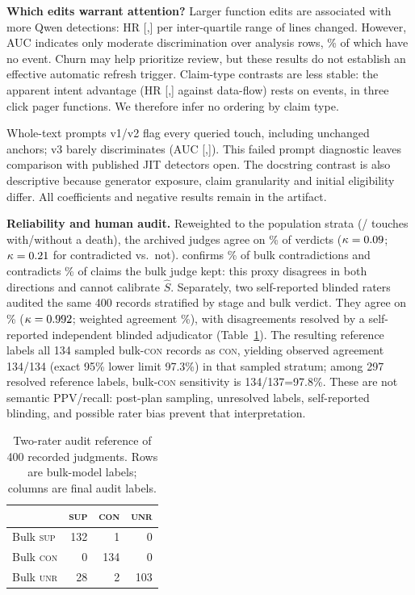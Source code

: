 \textbf{Which edits warrant attention?} Larger function edits are associated with more Qwen detections: HR \XLogLinesFnIqrHr{} [\XLogLinesFnIqrHrLo,\XLogLinesFnIqrHrHi] per inter-quartile range of lines changed. However, AUC \XHOneAucFn{} indicates only moderate discrimination over \XHOneNPairs{} analysis rows, \XHOneZeroShare\% of which have no event. Churn may help prioritize review, but these results do not establish an effective automatic refresh trigger. Claim-type contrasts are less stable: the apparent intent advantage (HR \XCloglogTyIntent{} [\XCloglogTyIntentLo,\XCloglogTyIntentHi] against data-flow) rests on \XHTwoIntentDeaths{} events, \XHTwoIntentDeathsClick{} in three click pager functions. We therefore infer no ordering by claim type.

Whole-text prompts v1/v2 flag every queried touch, including unchanged anchors; v3 barely discriminates (AUC \XHThreeVThreeAuc{} [\XHThreeVThreeAucLo,\XHThreeVThreeAucHi]). This failed prompt diagnostic leaves comparison with published JIT detectors open. The docstring contrast is also descriptive because generator exposure, claim granularity and initial eligibility differ. All coefficients and negative results remain in the artifact.

\textbf{Reliability and human audit.} Reweighted to the population strata (\XAFramePos{}/\XAFrameNeg{} touches with/without a death), the archived judges agree on \XAJudgeCommitAgreePct\% of verdicts ($\kappa=0.09$; $\kappa=0.21$ for contradicted vs.\ not). \XSecondModel{} confirms \XAJudgeCommitPrecision\% of bulk contradictions and contradicts \XAJudgeCommitSecondConWhereBulkNot\% of claims the bulk judge kept: this proxy disagrees in both directions and cannot calibrate $\hat S$. Separately, two self-reported blinded raters audited the same 400 records stratified by stage and bulk verdict. They agree on \XTwoRaterAgree\% ($\kappa=0.992$; weighted agreement \XTwoRaterWeightedAgree\%), with \XTwoRaterDisagreements{} disagreements resolved by a self-reported independent blinded adjudicator (Table~\ref{tab:audit}). The resulting reference labels all 134 sampled bulk-\textsc{con} records as \textsc{con}, yielding observed agreement 134/134 (exact 95\% lower limit 97.3\%) in that sampled stratum; among 297 resolved reference labels, bulk-\textsc{con} sensitivity is 134/137=97.8\%. These are not semantic PPV/recall: post-plan sampling, unresolved labels, self-reported blinding, and possible rater bias prevent that interpretation.

\begin{table}[t]
\centering\small
\caption{Two-rater audit reference of 400 recorded judgments. Rows are bulk-model labels; columns are final audit labels.}
\label{tab:audit}
\begin{tabular}{lrrr}
\toprule
 & \textsc{sup} & \textsc{con} & \textsc{unr}\\
\midrule
Bulk \textsc{sup} & 132 & 1 & 0\\
Bulk \textsc{con} & 0 & 134 & 0\\
Bulk \textsc{unr} & 28 & 2 & 103\\
\bottomrule
\end{tabular}
\end{table}
